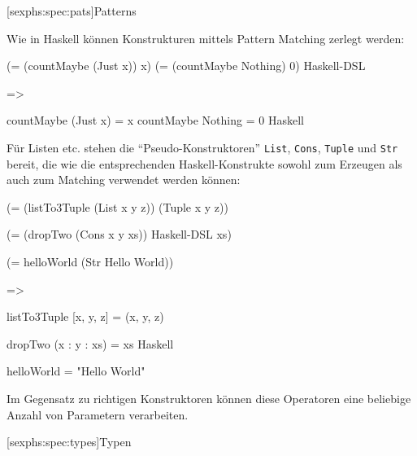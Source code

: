 \documentclass[12pt, a4paper, bibgerm]{scrbook}
\newenvironment{DIFnomarkup}{}{}
\newcommand\icode[1]{\lstinline?#1?}
\newcommand\lsubsection{}
\begin{document}
\lsubsection[sexphs:spec:pats]{Patterns}

Wie in Haskell können Konstrukturen mittels Pattern Matching zerlegt
werden:
\begin{DIFnomarkup}\begin{code}
(= (countMaybe (Just x)) x)
(= (countMaybe Nothing)  0)      Haskell-DSL

=>

countMaybe (Just x) = x
countMaybe Nothing  = 0          Haskell
\end{code}\end{DIFnomarkup}
Für Listen etc. stehen die "`Pseudo-Konstruktoren"' \icode{List},
\icode{Cons}, \icode{Tuple} und \icode{Str} bereit, die wie die
entsprechenden Haskell-Konstrukte sowohl zum Erzeugen als auch zum
Matching verwendet werden können:
\begin{DIFnomarkup}\begin{code}
(= (listTo3Tuple (List x y z)) 
   (Tuple x y z))

(= (dropTwo (Cons x y xs))             Haskell-DSL
  xs)

(= helloWorld (Str Hello World))

=>

listTo3Tuple [x, y, z] = (x, y, z)

dropTwo (x : y : xs) = xs              Haskell

helloWorld = "Hello World"
\end{code}\end{DIFnomarkup}
Im Gegensatz zu richtigen Konstruktoren können diese Operatoren eine
beliebige Anzahl von Parametern verarbeiten.

\lsubsection[sexphs:spec:types]{Typen}
\end{document}
